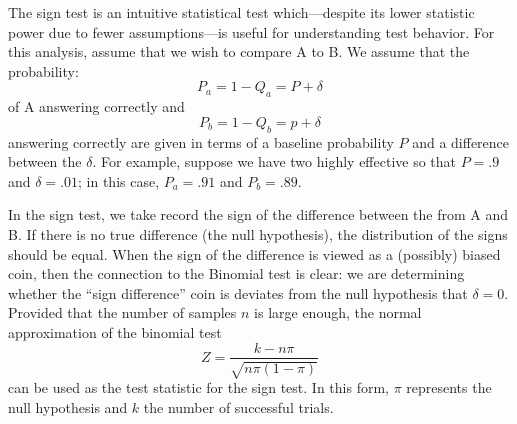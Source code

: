 The sign test is an intuitive statistical test which---despite its lower statistic power due to fewer assumptions---is useful for understanding test behavior.
For this analysis, assume that we wish to compare \subj{} A to \subj{} B.
We assume that the probability:
\begin{equation} \label{eq:pa}
    P_a = 1-Q_a = P+\delta
\end{equation}
\noindent
of A answering correctly and
\begin{equation} \label{eq:pb}
    P_b=1-Q_b=p+\delta
\end{equation}
\noindent
answering correctly are given in terms of a baseline probability $P$ and a difference between the \subjs{} $\delta$.
For example, suppose we have two highly effective \subjs{} so that $P=.9$ and $\delta=.01$; in this case, $P_a=.91$ and $P_b=.89$.

In the sign test, we take record the sign of the difference between the \resps{} from A and B.
If there is no true difference (the null hypothesis), the distribution of the signs should be equal.
When the sign of the difference is viewed as a (possibly) biased coin, then the connection to the Binomial test is clear: we are determining whether the ``sign difference'' coin is deviates from the null hypothesis that $\delta=0$.
Provided that the number of samples $n$ is large enough, the normal approximation of the binomial test
\begin{equation}
    Z=\frac{k-n\pi}{\sqrt{n\pi(1-\pi)}}
\end{equation}
can be used as the test statistic for the sign test.
In this form, $\pi$ represents the null hypothesis and $k$ the number of successful trials.

